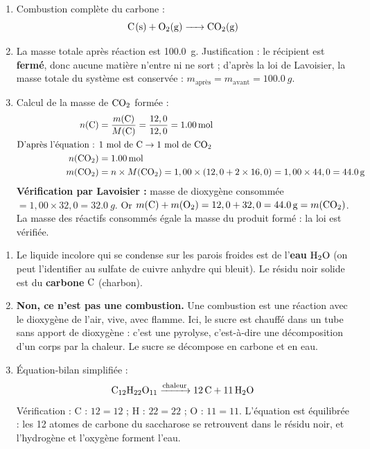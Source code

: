 \documentclass[11pt]{article}
\newcommand{\cle}[1]{{\popxbold\color{popdark}#1}}
\begin{document}
\begin{corrige}
\begin{enumerate}
    \item Combustion complète du carbone :
    \[ \ce{C(s) + O2(g) -> CO2(g)} \]
    \item La masse totale après réaction est \SI{100,0}{g}. Justification : le récipient est \textbf{fermé}, donc aucune matière n'entre ni ne sort ; d'après la \cle{loi de Lavoisier}, la masse totale du système est conservée : $m_{\text{après}} = m_{\text{avant}} = \SI{100,0}{g}$.
    \item Calcul de la masse de $\ce{CO2}$ formée :
    \begin{align*}
    n(\ce{C}) &= \frac{m(\ce{C})}{M(\ce{C})} = \frac{12,0}{12,0} = \SI{1,00}{mol} \\
    \text{D'après l'équation : } & 1\ \text{mol de } \ce{C} \to 1\ \text{mol de } \ce{CO2} \\
    n(\ce{CO2}) &= \SI{1,00}{mol} \\
    m(\ce{CO2}) &= n \times M(\ce{CO2}) = 1,00 \times (12,0 + 2 \times 16,0) = 1,00 \times 44,0 = \SI{44,0}{g}
    \end{align*}
    \textbf{Vérification par Lavoisier :} masse de dioxygène consommée $= 1,00 \times 32,0 = \SI{32,0}{g}$. Or $m(\ce{C}) + m(\ce{O2}) = 12,0 + 32,0 = \SI{44,0}{g} = m(\ce{CO2})$. La masse des réactifs consommés égale la masse du produit formé : la loi est vérifiée.
\end{enumerate}
\end{corrige}

\begin{corrige}
\begin{enumerate}
    \item Le liquide incolore qui se condense sur les parois froides est de l'\textbf{eau} $\ce{H2O}$ (on peut l'identifier au sulfate de cuivre anhydre qui bleuit). Le résidu noir solide est du \textbf{carbone} $\ce{C}$ (charbon).
    \item \textbf{Non, ce n'est pas une combustion.} Une combustion est une réaction avec le dioxygène de l'air, vive, avec flamme. Ici, le sucre est chauffé dans un tube sans apport de dioxygène : c'est une \cle{pyrolyse}, c'est-à-dire une décomposition d'un corps par la chaleur. Le sucre se décompose en carbone et en eau.
    \item Équation-bilan simplifiée :
    \[ \ce{C12H22O11 ->[chaleur] 12C + 11H2O} \]
    Vérification : C : $12 = 12$ ; H : $22 = 22$ ; O : $11 = 11$. L'équation est équilibrée : les 12 atomes de carbone du saccharose se retrouvent dans le résidu noir, et l'hydrogène et l'oxygène forment l'eau.
\end{enumerate}
\end{corrige}
\end{document}
